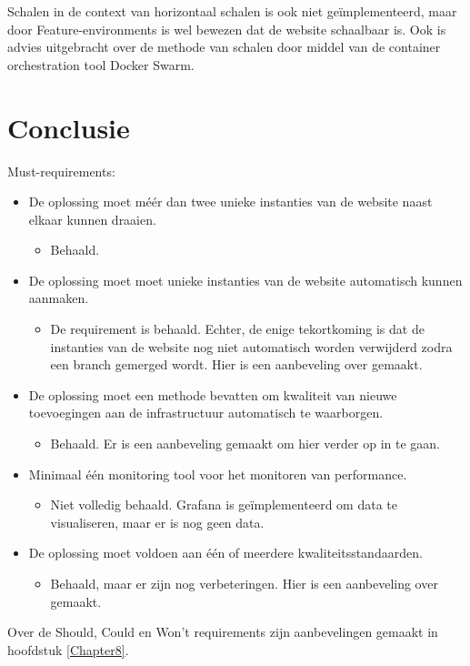 Schalen in de context van horizontaal schalen is ook niet geïmplementeerd, maar door Feature-environments is wel bewezen dat de website schaalbaar is. Ook is advies uitgebracht over de methode van schalen door middel van de container orchestration tool Docker Swarm.

\section{Conclusie}

Must-requirements:
\begin{itemize}
	\item De oplossing moet méér dan twee unieke instanties van de website naast elkaar kunnen draaien.
    \begin{itemize}
        \item Behaald.
    \end{itemize}

	\item De oplossing moet moet unieke instanties van de website automatisch kunnen aanmaken.
    \begin{itemize}
        \item De requirement is behaald. Echter, de enige tekortkoming is dat de instanties van de website nog niet automatisch worden verwijderd zodra een branch gemerged wordt. Hier is een aanbeveling over gemaakt.
    \end{itemize}

	\item De oplossing moet een methode bevatten om kwaliteit van nieuwe toevoegingen aan de infrastructuur automatisch te waarborgen.
    \begin{itemize}
        \item Behaald. Er is een aanbeveling gemaakt om hier verder op in te gaan.
    \end{itemize}

	\item Minimaal één monitoring tool voor het monitoren van performance.
    \begin{itemize}
        \item Niet volledig behaald. Grafana is geïmplementeerd om data te visualiseren, maar er is nog geen data. 
    \end{itemize}

	\item De oplossing moet voldoen aan één of meerdere kwaliteitsstandaarden.
    \begin{itemize}
        \item Behaald, maar er zijn nog verbeteringen. Hier is een aanbeveling over gemaakt.
    \end{itemize}
\end{itemize}

Over de Should, Could en Won't requirements zijn aanbevelingen gemaakt in hoofdstuk \ref{Chapter8}.
